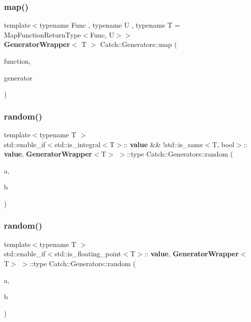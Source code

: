 \mbox{\label{namespace_catch_1_1_generators_af33fd06c51ac9173c3bee2ddee2559a6}} 
\subsubsection{map()}
{\footnotesize\ttfamily template$<$typename Func , typename U , typename T  = Map\+Function\+Return\+Type$<$\+Func, U$>$$>$ \\
\textbf{ Generator\+Wrapper}$<$ T $>$ Catch\+::\+Generators\+::map (\begin{DoxyParamCaption}\item[{Func \&\&}]{function,  }\item[{\textbf{ Generator\+Wrapper}$<$ U $>$ \&\&}]{generator }\end{DoxyParamCaption})}

\mbox{\label{namespace_catch_1_1_generators_a5003f0b96aaa4b1a53ebd81f4e93ab0c}} 
\subsubsection{random()\hspace{0.1cm}{\footnotesize\ttfamily [1/2]}}
{\footnotesize\ttfamily template$<$typename T $>$ \\
std\+::enable\+\_\+if$<$std\+::is\+\_\+integral$<$T$>$\+::\textbf{ value} \&\& !std\+::is\+\_\+same$<$T, bool$>$\+::\textbf{ value},\textbf{ Generator\+Wrapper}$<$T$>$ $>$\+::type Catch\+::\+Generators\+::random (\begin{DoxyParamCaption}\item[{T}]{a,  }\item[{T}]{b }\end{DoxyParamCaption})}

\mbox{\label{namespace_catch_1_1_generators_a677b543146adcdfe23fdfff48007a57e}} 
\subsubsection{random()\hspace{0.1cm}{\footnotesize\ttfamily [2/2]}}
{\footnotesize\ttfamily template$<$typename T $>$ \\
std\+::enable\+\_\+if$<$std\+::is\+\_\+floating\+\_\+point$<$T$>$\+::\textbf{ value},\textbf{ Generator\+Wrapper}$<$T$>$ $>$\+::type Catch\+::\+Generators\+::random (\begin{DoxyParamCaption}\item[{T}]{a,  }\item[{T}]{b }\end{DoxyParamCaption})}

